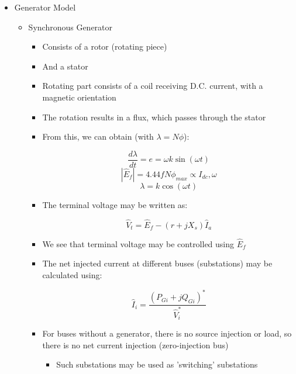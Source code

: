 \begin{itemize}

  \item Generator Model

    \begin{itemize}

      \item Synchronous Generator

        \begin{itemize}

          \item Consists of a rotor (rotating piece)

          \item And a stator

          \item Rotating part consists of a coil receiving D.C. current, with a magnetic orientation

          \item The rotation results in a flux, which passes through the stator

          \item From this, we can obtain (with $\lambda=N\phi$):

            $$\frac{d\lambda}{dt}=e=\omega k\sin(\omega t)$$
            $$|\hat{E}_f|=4.44 f N\phi_{max}\propto I_{dc},\omega$$
            $$\lambda=k\cos(\omega t)$$

          \item The terminal voltage may be written as:

            $$\hat{V}_t=\hat{E}_f-(r+jX_s)\hat{I}_a$$

          \item We see that terminal voltage may be controlled using $\hat{E}_f$

          \item The net injected current at different buses (substations) may be calculated using:

            $$\hat{I}_i=\frac{(P_{Gi}+jQ_{Gi})^*}{\hat{V}_i^*}$$

          \item For buses without a generator, there is no source injection or load, so there is no net current injection (zero-injection bus)

            \begin{itemize}

              \item Such substations may be used as 'switching' substations


\end{itemize}
\end{itemize}
\end{itemize}
\end{itemize}
